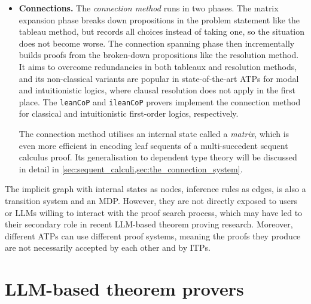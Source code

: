 \documentclass[twoside]{report}
\begin{document}
\begin{itemize}

    \item \textbf{Connections.} The \emph{connection method} \cite{prawitz1968proof,andrews1981theorem,bibel1981matrices} runs in two phases. The matrix expansion phase breaks down propositions in the problem statement like the tableau method, but records all choices instead of taking one, so the situation does not become worse. The connection spanning phase then incrementally builds proofs from the broken-down propositions like the resolution method. It aims to overcome redundancies in both tableaux and resolution methods, and its non-classical variants \cite{wallen1987automated} are popular in state-of-the-art ATPs for modal and intuitionistic logics, where clausal resolution does not apply in the first place. The \texttt{leanCoP} and \texttt{ileanCoP} provers \cite{otten2008leancop} implement the connection method for classical and intuitionistic first-order logics, respectively.

          The connection method utilises an internal state called a \emph{matrix}, which is even more efficient in encoding leaf sequents of a multi-succedent sequent calculus proof. Its generalisation to dependent type theory will be discussed in detail in \cref{sec:sequent_calculi,sec:the_connection_system}.
\end{itemize}

The implicit graph with internal states as nodes, inference rules as edges, is also a transition system and an MDP. However, they are not directly exposed to users or LLMs willing to interact with the proof search process, which may have led to their secondary role in recent LLM-based theorem proving research. Moreover, different ATPs can use different proof systems, meaning the proofs they produce are not necessarily accepted by each other and by ITPs.

\section{LLM-based theorem provers}
\label{sec:introduction_ltp}
\end{document}
